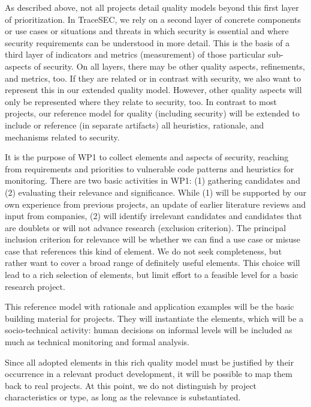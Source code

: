 As described above, not all projects detail quality models beyond this first layer of prioritization. In TraceSEC, we rely on a second layer of concrete components or use cases or situations and threats in which security is essential and where security requirements can be understood in more detail. This is the basis of a third layer of indicators and metrics (measurement) of those particular sub-aspects of security. On all layers, there may be other quality aspects, refinements, and metrics, too. If they are related or in contrast with security, we also want to represent this in our extended quality model. However, other quality aspects will only be represented where they relate to security, too. In contrast to most projects, our reference model for quality (including security) will be extended to include or reference (in separate artifacts) all heuristics, rationale, and mechanisms related to security. 

It is the purpose of WP1 to collect elements and aspects of security, reaching from requirements and priorities to vulnerable code patterns and heuristics for monitoring. There are two basic activities in WP1: (1) gathering candidates and (2) evaluating their relevance and significance. While (1) will be supported by our own experience from previous projects, an update of earlier literature reviews  and input from companies, (2) will identify irrelevant candidates and candidates that are doublets or will not advance research (exclusion criterion). The principal inclusion criterion for relevance will be whether we can find a use case or misuse case that references this kind of element. We do not seek completeness, but rather want to cover a broad range of definitely useful elements. This choice will lead to a rich selection of elements, but limit effort to a feasible level for a basic research project. 

This reference model with rationale and application examples will be the basic building material for projects. They will instantiate the elements, which will be a socio-technical activity: human decisions on informal levels will be included as much as technical monitoring and formal analysis.

Since all adopted elements in this rich quality model must be justified by their occurrence in a relevant product development, it will be possible to map them back to real projects. At this point, we do not distinguish by project characteristics or type, as long as the relevance is substantiated. 

